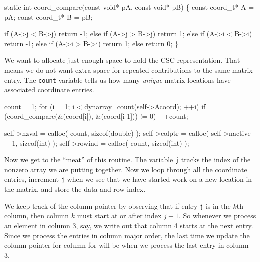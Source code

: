 \nwendcode{}\nwdocspar

\nwenddocs{}\plusendmoddef
static int coord_compare(const void* pA, const void* pB)
\{
    const coord_t* A = pA;
    const coord_t* B = pB;

    if      (A->j < B->j) return -1;
    else if (A->j > B->j) return  1;
    else if (A->i < B->i) return -1;
    else if (A->i > B->i) return  1;
    else                  return 0;
\}

\nwendcode{}\nwdocspar

We want to allocate just enough space to hold the CSC representation.
That means we do not want extra space for repeated contributions to
the same matrix entry.  The {\tt{}count} variable tells us how many
\emph{unique} matrix locations have associated coordinate entries.

\nwenddocs{}\endmoddef
count = 1;
for (i = 1; i < dynarray_count(self->Acoord); ++i)
     if (coord_compare(&(coord[i]), &(coord[i-1])) != 0)
         ++count;

\nwendcode{}\nwdocspar

\nwenddocs{}\endmoddef
self->nzval  = calloc( count,             sizeof(double) );
self->colptr = calloc( self->nactive + 1, sizeof(int)    );
self->rowind = calloc( count,             sizeof(int)    );

\nwendcode{}\nwdocspar

Now we get to the ``meat'' of this routine.  The variable {\tt{}j}
tracks the index of the nonzero array we are putting together.
Now we loop through all the coordinate entries, increment
{\tt{}j} when we see that we have started work on a new location
in the matrix, and store the data and row index.

We keep track of the column pointer by observing that if
entry {\tt{}j} is in the $k$th column, then column $k$ must start
at or after index $j+1$.  So whenever we process an element in
column 3, say, we write out that column 4 starts at the next entry.
Since we process the entries in column major order, the last time
we update the column pointer for column for will be when we process
the last entry in column 3.

